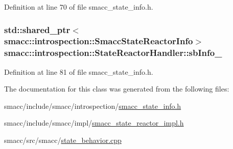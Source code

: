 Definition at line 70 of file smacc\+\_\+state\+\_\+info.\+h.

\subsubsection[{\texorpdfstring{sb\+Info\+\_\+}{sbInfo_}}]{\setlength{\rightskip}{0pt plus 5cm}std\+::shared\+\_\+ptr$<${\bf smacc\+::introspection\+::\+Smacc\+State\+Reactor\+Info}$>$ smacc\+::introspection\+::\+State\+Reactor\+Handler\+::sb\+Info\+\_\+}\hypertarget{classsmacc_1_1introspection_1_1StateReactorHandler_a6dbf5d1458265c3565e18ac77851ae63}{}\label{classsmacc_1_1introspection_1_1StateReactorHandler_a6dbf5d1458265c3565e18ac77851ae63}


Definition at line 81 of file smacc\+\_\+state\+\_\+info.\+h.



The documentation for this class was generated from the following files\+:\begin{DoxyCompactItemize}
\item 
smacc/include/smacc/introspection/\hyperlink{smacc__state__info_8h}{smacc\+\_\+state\+\_\+info.\+h}\item 
smacc/include/smacc/impl/\hyperlink{smacc__state__reactor__impl_8h}{smacc\+\_\+state\+\_\+reactor\+\_\+impl.\+h}\item 
smacc/src/smacc/\hyperlink{state__behavior_8cpp}{state\+\_\+behavior.\+cpp}\end{DoxyCompactItemize}
